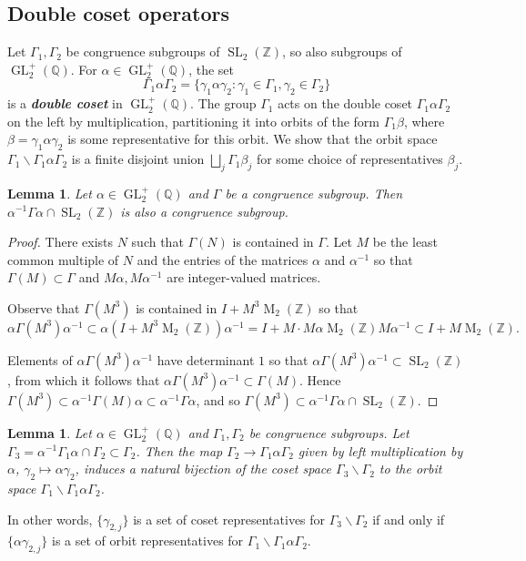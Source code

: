 \documentclass[10pt,leqno,twoside]{article}
\theoremstyle{plain}
\newtheorem{lemma}[lem]{Lemma}
\theoremstyle{definition}
\numberwithin{equation}{section}
\numberwithin{lem}{section}
\newcommand{\textib}[1]{\textbf{\textit{#1\index{#1}}}} %
\DeclareMathOperator{\Mat}{M}
\DeclareMathOperator{\GL}{GL}
\DeclareMathOperator{\SL}{SL}
\newcommand{\slz}{\SL_2(\mathbb{Z})}
\newcommand{\glqp}{\GL_2^+(\mathbb{Q})}
\begin{document}
\subsection{Double coset operators}
Let $\varGamma_1,\varGamma_2$ be congruence subgroups of $\slz$, so also subgroups of $\glqp$. For $\alpha\in\glqp$, the set
\[\varGamma_1\alpha\varGamma_2 = \{\gamma_1\alpha\gamma_2 : \gamma_1\in\varGamma_1, \gamma_2\in\varGamma_2\}\] is a \textib{double coset} in $\glqp$. The group $\varGamma_1$ acts on the double coset $\varGamma_1\alpha\varGamma_2$ on the left by multiplication, partitioning it into orbits of the form $\varGamma_1\beta$, where $\beta = \gamma_1\alpha\gamma_2$ is some representative for this orbit. We show that the orbit space  $\varGamma_1\backslash\varGamma_1\alpha\varGamma_2$ is a finite disjoint union $\bigsqcup_j\varGamma_1\beta_j$ for some choice of representatives $\beta_j$.
\begin{lemma}\label{lem: conjugation congruence subgroup}
    Let $\alpha\in\glqp$ and $\varGamma$ be a congruence subgroup. Then $\alpha^{-1}\varGamma\alpha\cap\slz$ is also a congruence subgroup.
\end{lemma}
\begin{proof}
    There exists $N$ such that $\varGamma(N)$ is contained in $\varGamma$. Let $M$ be the least common multiple of $N$ and the entries of the matrices $\alpha$ and $\alpha^{-1}$ so that $\varGamma(M)\subset \varGamma$ and $M\alpha, M\alpha^{-1}$ are integer-valued matrices.
    
    Observe that $\varGamma(M^3)$ is contained in $I + M^3\Mat_2(\mathbb Z)$ so that 
    \[\alpha\varGamma(M^3)\alpha^{-1}\subset \alpha(I + M^3\Mat_2(\mathbb Z))\alpha^{-1} = I + M\cdot M\alpha \Mat_2(\mathbb Z) M\alpha^{-1}\subset I+M\Mat_2(\mathbb{Z}).\]
    
    Elements of $\alpha\varGamma(M^3)\alpha^{-1}$ have determinant $1$ so that $\alpha\varGamma(M^3)\alpha^{-1}\subset \slz$, from which it follows that $\alpha\varGamma(M^3)\alpha^{-1}\subset \varGamma(M)$. Hence $\varGamma(M^3)\subset \alpha^{-1}\varGamma(M)\alpha \subset \alpha^{-1}\varGamma\alpha$, and so $\varGamma(M^3)\subset \alpha^{-1}\varGamma\alpha\cap \slz$.
\end{proof}
\begin{lemma}\label{lem: double coset coset/orbit spaces}
    Let $\alpha\in\glqp$ and $\varGamma_1,\varGamma_2$ be congruence subgroups. Let $\varGamma_3 = \alpha^{-1}\varGamma_1\alpha\cap \varGamma_2\subset \varGamma_2$. Then the map $\varGamma_2\to \varGamma_1\alpha\varGamma_2$ given by left multiplication by $\alpha$, $\gamma_2\mapsto\alpha\gamma_2$, induces a natural bijection of the coset space $\varGamma_3\backslash\varGamma_2$ to the orbit space $\varGamma_1\backslash\varGamma_1\alpha\varGamma_2$.
\end{lemma} In other words, $\{\gamma_{2,j}\}$ is a set of coset representatives for $\varGamma_3\backslash \varGamma_2$ if and only if $\{\alpha\gamma_{2,j}\}$ is a set of orbit representatives for $\varGamma_1\backslash \varGamma_1\alpha\varGamma_2$.
\end{document}
